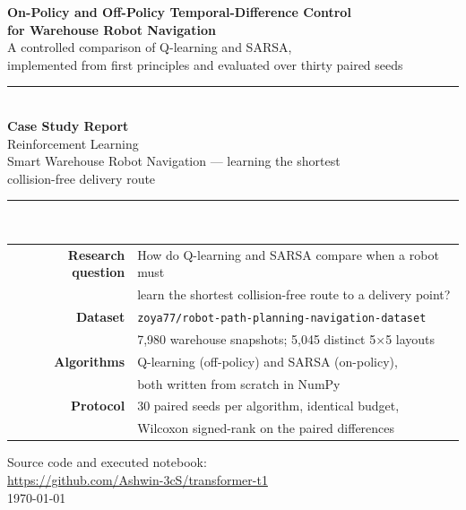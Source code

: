 \documentclass[11pt,a4paper,oneside]{report}
\newcommand{\code}[1]{\texttt{\small #1}}
\begin{document}
\begin{titlepage}
\centering
\vspace*{0.6in}

{\Large\bfseries On-Policy and Off-Policy Temporal-Difference Control\\[6pt]
for Warehouse Robot Navigation}\\[10pt]

{\large A controlled comparison of Q-learning and SARSA,\\
implemented from first principles and evaluated over thirty paired seeds}\\[0.5in]

\rule{\textwidth}{0.8pt}\\[0.25in]

{\large\textbf{Case Study Report}}\\[6pt]
{\large Reinforcement Learning}\\[6pt]
{\large Smart Warehouse Robot Navigation --- learning the shortest\\
collision-free delivery route}\\[0.3in]

\rule{\textwidth}{0.8pt}\\[0.5in]

\begin{tabular}{rl}
\textbf{Research question} & How do Q-learning and SARSA compare when a robot must\\
                           & learn the shortest collision-free route to a delivery point?\\[8pt]
\textbf{Dataset}           & \code{zoya77/robot-path-planning-navigation-dataset}\\
                           & 7{,}980 warehouse snapshots; 5{,}045 distinct 5$\times$5 layouts\\[8pt]
\textbf{Algorithms}        & Q-learning (off-policy) and SARSA (on-policy),\\
                           & both written from scratch in NumPy\\[8pt]
\textbf{Protocol}          & 30 paired seeds per algorithm, identical budget,\\
                           & Wilcoxon signed-rank on the paired differences\\
\end{tabular}

\vfill
{\large Source code and executed notebook:}\\[4pt]
\url{https://github.com/Ashwin-3cS/transformer-t1}\\[0.3in]
{\large \today}
\end{titlepage}

\setcounter{page}{2}


\tableofcontents
\listoffigures
\listoftables

\clearpage
{}
\setcounter{page}{1}












\end{document}
